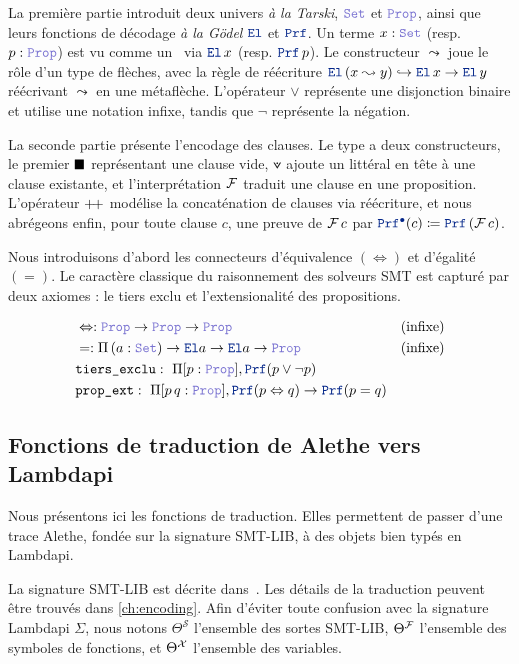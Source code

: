 La première partie introduit deux univers \emph{à la Tarski}, $\set$ et $\prop$, ainsi que leurs fonctions
de décodage \emph{à la Gödel} $\el$ et $\prf$. Un terme $x : \set$ (resp. $p : \prop$) est vu comme un \type\ via $\el\,x$
(resp. $\prf\,p$).
Le constructeur $\leadsto$ joue le rôle d'un type de flèches, avec la règle de réécriture $\el\,(x\leadsto y)\hookrightarrow \el\,x\rightarrow \el\,y$ réécrivant $\leadsto$ en une métaflèche.
L'opérateur $\lor$ représente une disjonction binaire et utilise une notation infixe, tandis que $\neg$ représente la négation.

La seconde partie présente l'encodage des clauses. Le type  a deux constructeurs, le premier $\nil$ représentant une clause vide,
$\veedot$ ajoute un littéral en tête à une clause existante, et l'interprétation $\cal{F}$ traduit une clause en une proposition.
L'opérateur $\pp$ modélise la concaténation de clauses  via réécriture, et nous
abrégeons enfin, pour toute clause $c$, une preuve de $\cal{F}\,c$ par $\pid(c) \coloneqq \prf\,(\cal{F}\,c)$.

Nous introduisons d'abord les connecteurs d'équivalence $(\Leftrightarrow)$ et d'égalité $(=)$.
Le caractère classique du raisonnement des solveurs SMT est capturé par deux axiomes : le tiers exclu et l'extensionalité des propositions.

\begin{align*}
&\Leftrightarrow :  \prop \ra \prop \ra \prop & \text{(infixe)}\\
&= : \Pi\,(a: \set) \ra \el a \ra \el a \ra \prop & \text{(infixe)} \\
&\kw{tiers\_exclu}:\  \Pi [p: \prop], \prf (p \lor \neg p) & \\
&\kw{prop\_ext}:\  \Pi [p\,q: \prop], \prf (p \Leftrightarrow q ) \rightarrow \prf (p = q) &
\end{align*}

\subsection*{Fonctions de traduction de Alethe vers Lambdapi}

Nous présentons ici les fonctions de traduction. Elles permettent de passer d'une trace Alethe, fondée sur la signature SMT-LIB, à des objets bien typés en Lambdapi.

La signature SMT-LIB est décrite dans~\cite[\S 5.2.1]{smtlib}. Les détails de la traduction peuvent être trouvés dans \cref{ch:encoding}.
Afin d'éviter toute confusion avec la signature Lambdapi $\Sigma$, nous notons $\Theta^\mathcal{S}$ l'ensemble des sortes SMT-LIB, $\Theta^\cal{F}$ l'ensemble des symboles de fonctions, et $\Theta^\cal{X}$ l'ensemble des variables.

